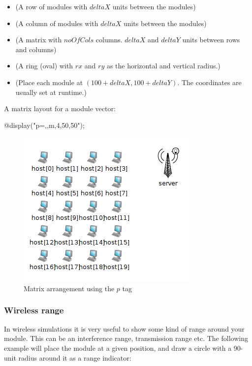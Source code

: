 \begin{itemize}
  \item {} (A row of modules with $deltaX$ units between the modules)
  \item {} (A column of modules with $deltaX$ units between the modules)
  \item {} (A matrix with $noOfCols$ columns.
            $deltaX$ and $deltaY$ units between rows and columns)
  \item {} (A ring (oval) with $rx$ and $ry$ as the horizontal and vertical radius.)
  \item {} (Place each module at $(100+deltaX, 100+deltaY)$.
            The coordinates are usually set at runtime.)
\end{itemize}

A matrix layout for a module vector:

\begin{ned}
@display("p=,,m,4,50,50");
\end{ned}

\begin{figure}[htbp]
  \begin{center}
    \includegraphics{figures/graphics-ptag}
    \caption{Matrix arrangement using the $p$ tag}
    \label{fig:graphics-ptag}
  \end{center}
\end{figure}

\subsubsection{Wireless range}
In wireless simulations it is very useful to show some kind of range
around your module. This can be an interference range, transmission range
etc. The following example will place the module at a given position,
and draw a circle with a 90-unit radius around it as a range indicator:


